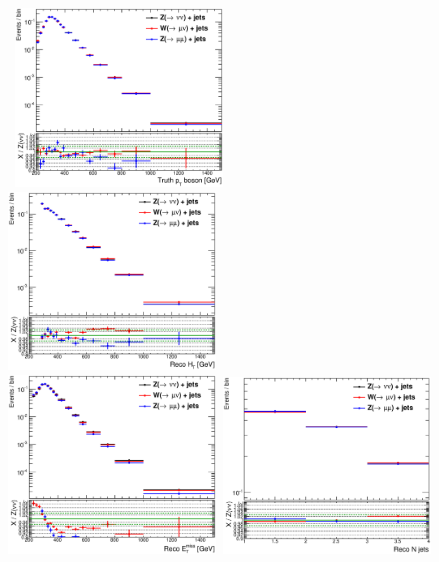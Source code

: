 \begin{figure}
\begin{center}
\mbox{
  \includegraphics[width=0.49\textwidth]{Appendix_ClosureTestZnunu/Figures/compareNormalized_bosonVec_truth_pt_A6_Nom.eps}
  \includegraphics[width=0.49\textwidth]{Appendix_ClosureTestZnunu/Figures/compareNormalized_HT_A6_Nom.eps}
}
\mbox{
  \includegraphics[width=0.49\textwidth]{Appendix_ClosureTestZnunu/Figures/compareNormalized_met_A6_Nom.eps}
  \includegraphics[width=0.49\textwidth]{Appendix_ClosureTestZnunu/Figures/compareNormalized_n_jets_A6_Nom.eps}
}
\end{center}
\end{figure}
